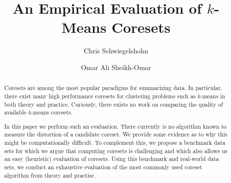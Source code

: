 \documentclass[a4paper,UKenglish,cleveref, autoref, thm-restate, anonymous]{sea2022}
\title{An Empirical Evaluation of $k$-Means Coresets} %
\author{Chris Schwiegelshohn}{Department of Computer Science, Aarhus University, Denmark }{schwiegelshohn@cs.au.dk}{[orcid]}{(Optional) author-specific funding acknowledgements}%
\author{Omar Ali Sheikh-Omar
}{Department of Computer Science, Aarhus University, Denmark}{omar@cs.au.dk}{https://orcid.org/0000-0002-0042-5231}{Innovation Fund Denmark, grant agreement 0153-00233A.}
\begin{document}
\maketitle

\begin{abstract}
Coresets are among the most popular paradigms for summarizing data. In particular, there exist many high performance coresets for clustering problems such as $k$-means in both theory and practice. Curiously, there exists no work on comparing the quality of available $k$-means coresets. 

In this paper we perform such an evaluation. There currently is no algorithm known to measure the distortion of a candidate coreset. We provide some evidence as to why this might be computationally difficult.
To complement this, we propose a benchmark data sets for which we argue that computing coresets is challenging and which also allows us an easy (heuristic) evaluation of coresets. Using this benchmark and real-world data sets, we conduct an exhaustive evaluation of the most commonly used coreset algorithm from theory and practise.
\end{abstract}

\newpage












\newpage


\newpage
\appendix



\end{document}
